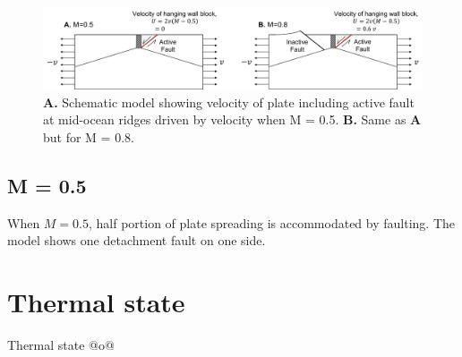 \documentclass[letterpaper,12pt,notitle]{memphisthesis}                     %
\begin{document}
\begin{figure}[!htb]
	\centering
	\includegraphics[width=0.95\linewidth]{./figs/hangingwall.pdf}
	\caption{\textbf{A.} Schematic model showing velocity of plate including active fault at mid-ocean ridges driven by velocity when M = 0.5. \textbf{B.} Same as \textbf{A} but for M = 0.8. }
	\label{fig:hangingwall}
\end{figure}

\subsection{M = 0.5}

When $M=0.5$, half portion of plate spreading is accommodated by faulting. The model shows one detachment fault on one side. 


\section{Thermal state}

Thermal state @o@
\end{document}
